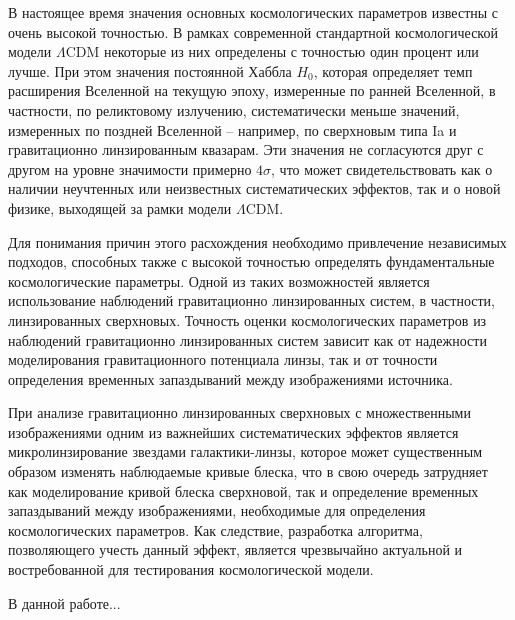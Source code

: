 В настоящее время значения основных космологических параметров известны с очень высокой точностью. В рамках современной стандартной космологической модели $\Lambda$CDM некоторые из них определены с точностью один процент или лучше. При этом значения постоянной Хаббла $H_0$, которая определяет темп расширения Вселенной на текущую эпоху, измеренные по ранней Вселенной, в частности, по реликтовому излучению, систематически меньше значений, измеренных по поздней Вселенной -- например, по сверхновым типа Ia и гравитационно линзированным квазарам. Эти значения не согласуются друг с другом на уровне значимости примерно $4\sigma$, что может свидетельствовать как о наличии неучтенных или неизвестных систематических эффектов, так и о новой физике, выходящей за рамки модели $\Lambda$CDM.

Для понимания причин этого расхождения необходимо привлечение независимых подходов, способных также с высокой точностью определять фундаментальные космологические параметры. Одной из таких возможностей является использование наблюдений гравитационно линзированных систем, в частности, линзированных сверхновых. Точность оценки космологических параметров из наблюдений гравитационно линзированных систем зависит как от надежности моделирования гравитационного потенциала линзы, так и от точности определения временных запаздываний между изображениями источника. 

При анализе гравитационно линзированных сверхновых с множественными изображениями одним из важнейших систематических эффектов является микролинзирование звездами галактики-линзы, которое может существенным образом изменять наблюдаемые кривые блеска, что в свою очередь затрудняет как моделирование кривой блеска сверхновой, так и определение временных запаздываний между изображениями, необходимые для определения космологических параметров. Как следствие, разработка алгоритма, позволяющего учесть данный эффект, является чрезвычайно актуальной и востребованной для тестирования космологической модели. 

В данной работе...

